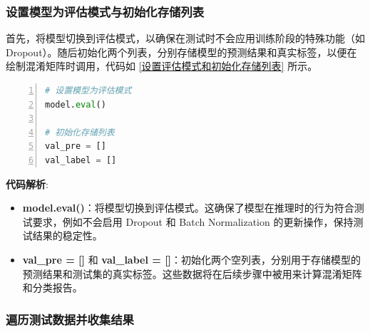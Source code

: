 \subsubsection{设置模型为评估模式与初始化存储列表}

首先，将模型切换到评估模式，以确保在测试时不会应用训练阶段的特殊功能（如 Dropout）。随后初始化两个列表，分别存储模型的预测结果和真实标签，以便在绘制混淆矩阵时调用，代码如 \ref{设置评估模式和初始化存储列表} 所示。

\begin{lstlisting}[language={python},label={设置评估模式和初始化存储列表},caption={设置评估模式和初始化存储列表}, basicstyle=\footnotesize\ttfamily, breaklines=true, numbers=left, frame=single,keepspaces=true,showstringspaces=false]
# 设置模型为评估模式
model.eval()

# 初始化存储列表
val_pre = []
val_label = []
\end{lstlisting}
\textbf{代码解析}:
\begin{itemize}
    \item \textbf{model.eval()}：将模型切换到评估模式。这确保了模型在推理时的行为符合测试要求，例如不会启用 Dropout 和 Batch Normalization 的更新操作，保持测试结果的稳定性。
    \item \textbf{val\_pre = []} 和 \textbf{val\_label = []}：初始化两个空列表，分别用于存储模型的预测结果和测试集的真实标签。这些数据将在后续步骤中被用来计算混淆矩阵和分类报告。
\end{itemize}


\subsubsection{遍历测试数据并收集结果}


